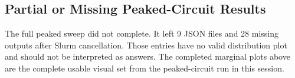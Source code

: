\subsection{Partial or Missing Peaked-Circuit Results}
The full peaked sweep did not complete. It left 9  JSON files and 28 missing outputs after Slurm cancellation. Those entries have no valid distribution plot and should not be interpreted as answers. The completed marginal plots above are the complete usable visual set from the peaked-circuit run in this session.
